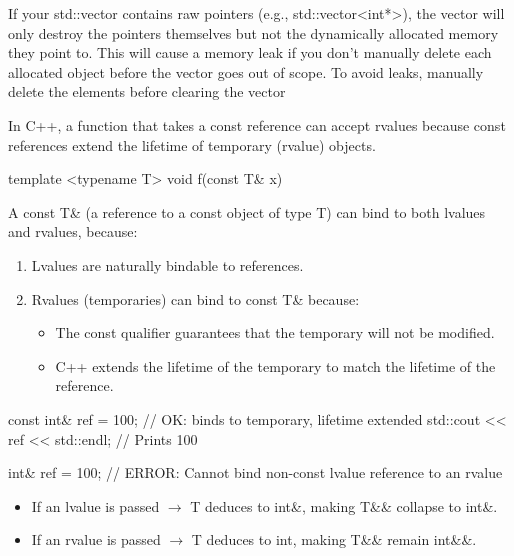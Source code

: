 \documentclass{report}
\begin{document}
    \pagebreak 
    \bigbreak \noindent 
    If your std::vector contains raw pointers (e.g., std::vector<int*>), the vector will only destroy the pointers themselves but not the dynamically allocated memory they point to. This will cause a memory leak if you don’t manually delete each allocated object before the vector goes out of scope.
    \bigbreak \noindent 
    To avoid leaks, manually delete the elements before clearing the vector

    \pagebreak 
    \bigbreak \noindent 
    In C++, a function that takes a const reference can accept rvalues because const references extend the lifetime of temporary (rvalue) objects.
    \bigbreak \noindent 
    \begin{cppcode}
        template <typename T>
        void f(const T& x) {}
    \end{cppcode}
    \bigbreak \noindent 
    A const T\& (a reference to a const object of type T) can bind to both lvalues and rvalues, because:
    \begin{enumerate}
        \item Lvalues are naturally bindable to references.
        \item Rvalues (temporaries) can bind to const T\& because:
            \begin{itemize}
                \item The const qualifier guarantees that the temporary will not be modified.
                \item C++ extends the lifetime of the temporary to match the lifetime of the reference.
            \end{itemize}
    \end{enumerate}
    \bigbreak \noindent 
    \begin{cppcode}
        const int& ref = 100; // OK: binds to temporary, lifetime extended
        std::cout << ref << std::endl; // Prints 100

        int& ref = 100; // ERROR: Cannot bind non-const lvalue reference to an rvalue
    \end{cppcode}
    \bigbreak \noindent 
    \begin{itemize}
        \item If an lvalue is passed $\to$ T deduces to int\&, making T\&\& collapse to int\&.
        \item If an rvalue is passed $\to$ T deduces to int, making T\&\& remain int\&\&.
    \end{itemize}
\end{document}
